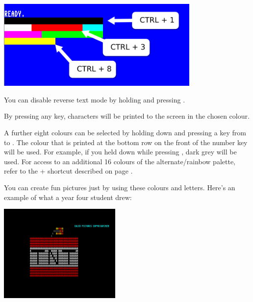 \begin{center}
\includegraphics[width={10cm}]{images/introduction-screen/colour-bars.png}
\end{center}


You can disable reverse text mode by holding  and pressing .

By pressing any key, characters will be printed to the screen in the chosen colour.

A further eight colours can be selected by holding down \megasymbolkey and pressing a key from  to .
The colour that is printed at the bottom row on the front of the number key will be used. For example, if you held
\megasymbolkey down while pressing , dark grey will be used. For access to an additional 16 colours of the alternate/rainbow palette, refer to the  +  shortcut described on page \pageref{appendix:controlcodes}.

\needspace{4cm}
You can create fun pictures just by using these colours and letters.  Here's an example of what a year four student drew:

\begin{center}
\includegraphics[width={6cm}]{images/caleb-PETSCII-TNT-final}
\end{center}


